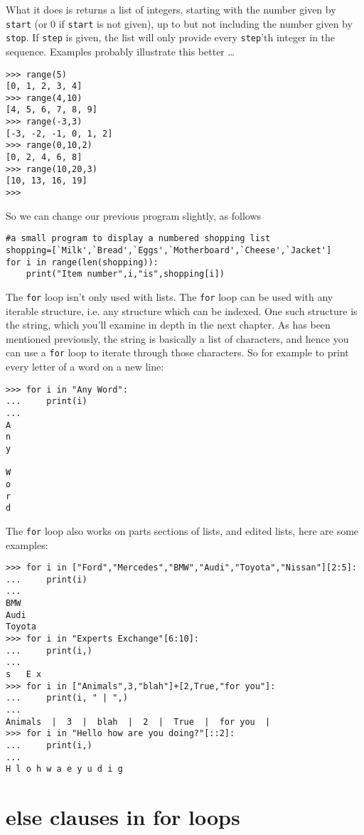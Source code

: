What it does is returns a list of integers, starting with the number   given by \texttt{start} (or 0 if \texttt{start} is not given), up to but not including   the number given by \texttt{stop}. If \texttt{step} is given, the list will only   provide every \texttt{step}'th integer in the sequence. Examples probably   illustrate this better \ldots

\begin{lstlisting}
>>> range(5)
[0, 1, 2, 3, 4]
>>> range(4,10)
[4, 5, 6, 7, 8, 9]
>>> range(-3,3)
[-3, -2, -1, 0, 1, 2]
>>> range(0,10,2)
[0, 2, 4, 6, 8]
>>> range(10,20,3)
[10, 13, 16, 19]
>>>
\end{lstlisting}

So we can change our previous program slightly, as follows
\begin{lstlisting}
#a small program to display a numbered shopping list
shopping=[`Milk',`Bread',`Eggs',`Motherboard',`Cheese',`Jacket']
for i in range(len(shopping)):
    print("Item number",i,"is",shopping[i])
\end{lstlisting}

The \texttt{for} loop isn't only used with lists. The \texttt{for} loop can be used with any iterable structure, i.e. any structure which can be indexed. One such structure is the string, which you'll examine in depth in the next chapter. As has been mentioned previously, the string is basically a list of characters, and hence you can use a \texttt{for} loop to iterate through those characters. So for example to print every letter of a word on a new line:   
\begin{lstlisting}
>>> for i in "Any Word":
...     print(i)
... 
A
n
y
 
W
o
r
d
\end{lstlisting}

 The \texttt{for} loop also works on parts sections of lists, and edited lists, here are some examples:
\begin{lstlisting}
>>> for i in ["Ford","Mercedes","BMW","Audi","Toyota","Nissan"][2:5]:
...     print(i)
... 
BMW
Audi
Toyota
>>> for i in "Experts Exchange"[6:10]:
...     print(i,)
... 
s   E x
>>> for i in ["Animals",3,"blah"]+[2,True,"for you"]:
...     print(i, " | ",)
... 
Animals  |  3  |  blah  |  2  |  True  |  for you  | 
>>> for i in "Hello how are you doing?"[::2]:
...     print(i,)
... 
H l o h w a e y u d i g
\end{lstlisting}

\section{else clauses in for loops}

